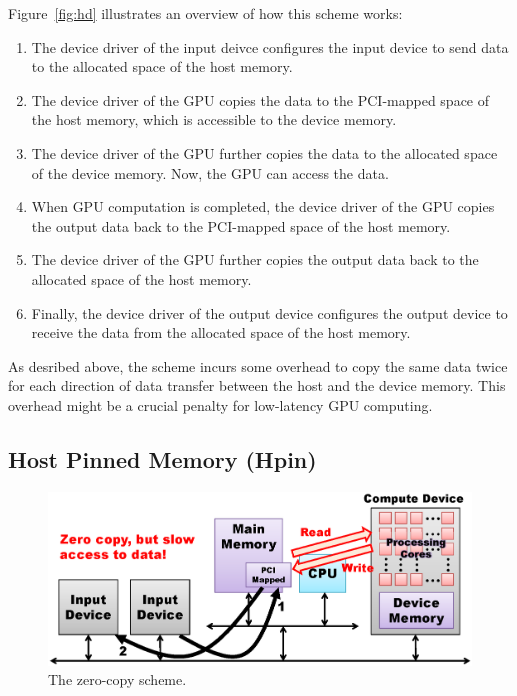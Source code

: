 Figure~\ref{fig:hd} illustrates an overview of how this scheme works:
\begin{enumerate}
 \item The device driver of the input deivce configures the input device
       to send data to the allocated space of the host memory.
 \item The device driver of the GPU copies the data to the
       PCI-mapped space of the host memory, which is accessible to the
       device memory.
 \item The device driver of the GPU further copies the data to the
       allocated space of the device memory.
       Now, the GPU can access the data.
 \item When GPU computation is completed, the device driver of the
       GPU copies the output data back to the PCI-mapped space of the
       host memory.
 \item The device driver of the GPU further copies the output data back
       to the allocated space of the host memory.
 \item Finally, the device driver of the output device configures the
       output device to receive the data from the allocated space of the
       host memory.
\end{enumerate}

As desribed above, the {\hd} scheme incurs some overhead to copy the
same data twice for each direction of data transfer between the host and
the device memory.
This overhead might be a crucial penalty for low-latency GPU computing.

\subsection{Host Pinned Memory (Hpin)}

\begin{figure}[!t]
 \centering
 \includegraphics[width=\hsize]{eps/hp.eps}
 \caption{The zero-copy {\hp} scheme.}
 \label{fig:hp}
\end{figure}

